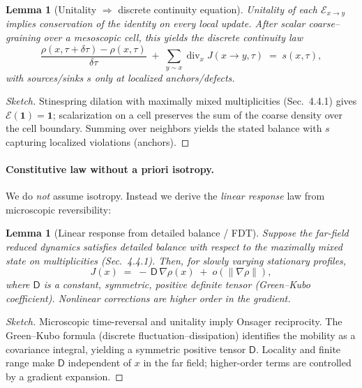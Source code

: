 \documentclass[11pt]{article}
\theoremstyle{plain}
\newtheorem{lemma}[theorem]{Lemma}
\theoremstyle{definition}
\begin{document}
\begin{lemma}[Unitality $\Rightarrow$ discrete continuity equation]
  \label{lem:continuity}
  Unitality of each $\mathcal{E}_{x\to y}$ implies conservation of the identity on every local update. After scalar coarse–graining over a mesoscopic cell, this yields the discrete continuity law
  \[
    \frac{\rho(x,\tau+\delta\tau)-\rho(x,\tau)}{\delta\tau}
    \;+\;\sum_{y\sim x}\operatorname{div}_x J(x\!\to\!y,\tau)
    \;=\; s(x,\tau),
  \]
  with sources/sinks $s$ only at localized anchors/defects.
\end{lemma}

\begin{proof}[Sketch]
  Stinespring dilation with maximally mixed multiplicities (Sec.~4.4.1) gives $\mathcal{E}(\mathbf{1})=\mathbf{1}$; scalarization on a cell preserves the sum of the coarse density over the cell boundary. Summing over neighbors yields the stated balance with $s$ capturing localized violations (anchors).
\end{proof}

\paragraph{Constitutive law without a priori isotropy.}
We do \emph{not} assume isotropy. Instead we derive the \emph{linear response} law from microscopic reversibility:

\begin{lemma}[Linear response from detailed balance / FDT]
  \label{lem:linear-response}
  Suppose the far-field reduced dynamics satisfies detailed balance with respect to the maximally mixed state on multiplicities (Sec.~4.4.1). Then, for slowly varying stationary profiles,
  \[
    J(x) \;=\; -\, \mathsf{D}\,\nabla \rho(x) \;+\; o(\|\nabla\rho\|),
  \]
  where $\mathsf{D}$ is a constant, symmetric, positive definite tensor (Green–Kubo coefficient). Nonlinear corrections are higher order in the gradient.
\end{lemma}

\begin{proof}[Sketch]
  Microscopic time-reversal and unitality imply Onsager reciprocity. The Green–Kubo formula (discrete fluctuation–dissipation) identifies the mobility as a covariance integral, yielding a symmetric positive tensor $\mathsf{D}$. Locality and finite range make $\mathsf{D}$ independent of $x$ in the far field; higher-order terms are controlled by a gradient expansion.
\end{proof}
\end{document}
